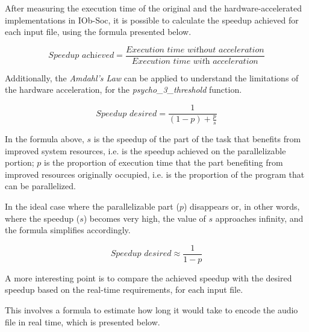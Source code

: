 
After measuring the execution time of the original and the hardware-accelerated implementations in IOb-Soc, it is possible to calculate the speedup achieved for each input file, using the formula presented below.

\begin{equation}
    \textit{Speedup achieved} = \frac{\textit{Execution time without acceleration}}{\textit{Execution time with acceleration}} 
\end{equation}

Additionally, the \textit{Amdahl's Law} can be applied to understand the limitations of the hardware acceleration, for the \textit{psycho\_3\_threshold} function.

\begin{equation}
    \textit{Speedup desired} = \frac{1}{(1 - p) + \frac{p}{s}} 
\end{equation}

In the formula above, $s$ is the speedup of the part of the task that benefits from improved system resources, i.e. is the speedup achieved on the parallelizable portion; $p$ is the proportion of execution time that the part benefiting from improved resources originally occupied, i.e. is the proportion of the program that can be parallelized.

In the ideal case where the parallelizable part ($p$) disappears or, in other words, where the speedup ($s$) becomes very high, the value of $s$ approaches infinity, and the formula simplifies accordingly.

\begin{equation}
    \textit{Speedup desired} \approx \frac{1}{1 - p}
\end{equation}

A more interesting point is to compare the achieved speedup with the desired speedup based on the real-time requirements, for each input file. 

This involves a formula to estimate how long it would take to encode the audio file in real time, which is presented below.

